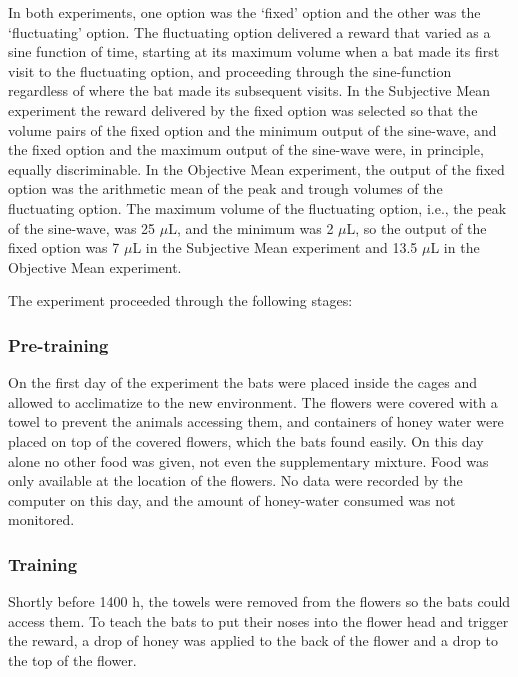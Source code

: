\documentclass[
]{article}
\begin{document}
In both experiments, one option was the `fixed' option and the other was the `fluctuating' option. The fluctuating option delivered a reward that varied as a sine function of time, starting at its maximum volume when a bat made its first visit to the fluctuating option, and proceeding through the sine-function regardless of where the bat made its subsequent visits. In the Subjective Mean experiment the reward delivered by the fixed option was selected so that the volume pairs of the fixed option and the minimum output of the sine-wave, and the fixed option and the maximum output of the sine-wave were, in principle, equally discriminable. In the Objective Mean experiment, the output of the fixed option was the arithmetic mean of the peak and trough volumes of the fluctuating option. The maximum volume of the fluctuating option, i.e., the peak of the sine-wave, was 25 \(\mu\)L, and the minimum was 2 \(\mu\)L, so the output of the fixed option was 7 \(\mu\)L in the Subjective Mean experiment and 13.5 \(\mu\)L in the Objective Mean experiment.

The experiment proceeded through the following stages:

\hypertarget{pre-training}{%
\subsubsection{Pre-training}\label{pre-training}}

On the first day of the experiment the bats were placed inside the cages and allowed to acclimatize to the new environment. The flowers were covered with a towel to prevent the animals accessing them, and containers of honey water were placed on top of the covered flowers, which the bats found easily. On this day alone no other food was given, not even the supplementary mixture. Food was only available at the location of the flowers. No data were recorded by the computer on this day, and the amount of honey-water consumed was not monitored.

\hypertarget{training}{%
\subsubsection{Training}\label{training}}

Shortly before 1400 h, the towels were removed from the flowers so the bats could access them. To teach the bats to put their noses into the flower head and trigger the reward, a drop of honey was applied to the back of the flower and a drop to the top of the flower.
\end{document}

